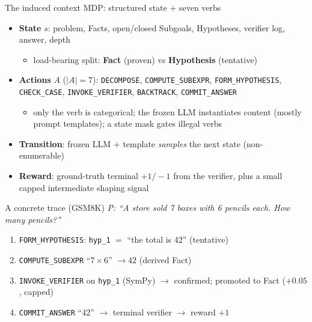 \documentclass[aspectratio=169]{beamer}
\newcommand{\verbword}[1]{\texttt{#1}}
\begin{document}
\begin{frame}{The induced context MDP: structured state + seven verbs}
  \begin{itemize}
    \item \textbf{State} $s$: problem, Facts, open/closed Subgoals, Hypotheses, verifier log, answer, depth
          \begin{itemize}\item load-bearing split: \textbf{Fact} (proven) vs \textbf{Hypothesis} (tentative)\end{itemize}
    \item \textbf{Actions} $A$ ($|A|{=}7$): \verbword{DECOMPOSE}, \verbword{COMPUTE\_SUBEXPR}, \verbword{FORM\_HYPOTHESIS}, \verbword{CHECK\_CASE}, \verbword{INVOKE\_VERIFIER}, \verbword{BACKTRACK}, \verbword{COMMIT\_ANSWER}
          \begin{itemize}\item only the verb is categorical; the frozen LLM instantiates content (mostly prompt templates); a state mask gates illegal verbs\end{itemize}
    \item \textbf{Transition}: frozen LLM $+$ template \emph{samples} the next state (non-enumerable)
    \item \textbf{Reward}: ground-truth terminal $+1/-1$ from the verifier, plus a small capped intermediate shaping signal
  \end{itemize}
\end{frame}

\begin{frame}{A concrete trace (GSM8K)}
  \small
  \textit{P: ``A store sold 7 boxes with 6 pencils each. How many pencils?''}
  \begin{enumerate}
    \item \verbword{FORM\_HYPOTHESIS}: \texttt{hyp\_1} $=$ ``the total is 42'' (tentative)
    \item \verbword{COMPUTE\_SUBEXPR} ``$7\times 6$'' $\to 42$ (derived Fact)
    \item \verbword{INVOKE\_VERIFIER} on \texttt{hyp\_1} (SymPy) $\to$ confirmed; promoted to Fact ($+0.05$, capped)
    \item \verbword{COMMIT\_ANSWER} ``42'' $\to$ terminal verifier $\to$ reward $+1$
  \end{enumerate}
\end{frame}
\end{document}
